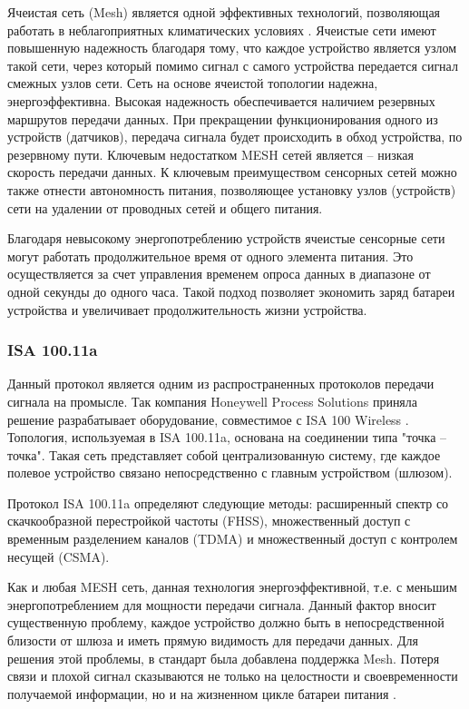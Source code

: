 Ячеистая сеть (Mesh) является одной эффективных технологий, позволяющая работать в неблагоприятных климатических условиях \cite{Sidney2015} . Ячеистые сети имеют повышенную надежность благодаря тому, что каждое устройство является узлом такой сети, через который помимо сигнал с самого устройства передается сигнал смежных узлов сети.
Сеть на основе ячеистой топологии надежна, энергоэффективна. Высокая надежность обеспечивается наличием резервных маршрутов передачи данных. При прекращении функционирования одного из устройств (датчиков), передача сигнала будет происходить в обход устройства, по резервному пути. Ключевым недостатком MESH сетей является -- низкая скорость передачи данных. К ключевым преимуществом сенсорных сетей можно также отнести автономность питания, позволяющее установку узлов (устройств) сети на удалении от проводных сетей и общего питания. 


Благодаря невысокому энергопотреблению устройств ячеистые сенсорные сети могут работать продолжительное время от одного элемента питания. Это осуществляется за счет управления временем опроса данных в диапазоне от одной секунды до одного часа. Такой подход позволяет  экономить заряд батареи устройства и увеличивает продолжительность жизни устройства.

\subsubsection{ISA 100.11a}
Данный протокол является одним из распространенных протоколов передачи сигнала на промысле. Так компания Honeywell Process Solutions приняла решение разрабатывает оборудование, совместимое с ISA 100 Wireless \cite{Sidney2015}.
Топология, используемая в ISA 100.11a, основана на соединении типа "точка -- точка". Такая сеть представляет собой централизованную систему, где каждое полевое устройство связано непосредственно с главным устройством (шлюзом). 

Протокол ISA 100.11a определяют следующие методы: расширенный спектр со скачкообразной перестройкой частоты (FHSS), множественный доступ с временным разделением каналов (TDMA) и множественный доступ с контролем несущей (CSMA).

Как и любая MESH сеть, данная технология энергоэффективной, т.е. с меньшим энергопотреблением для мощности передачи сигнала. Данный фактор вносит существенную проблему, каждое устройство должно быть в непосредственной близости от шлюза и иметь прямую видимость для передачи данных. Для решения этой проблемы, в стандарт была добавлена поддержка Mesh. Потеря связи и плохой сигнал сказываются не только на целостности и своевременности получаемой информации, но и на жизненном цикле батареи питания \cite{Tagirov2013}.

